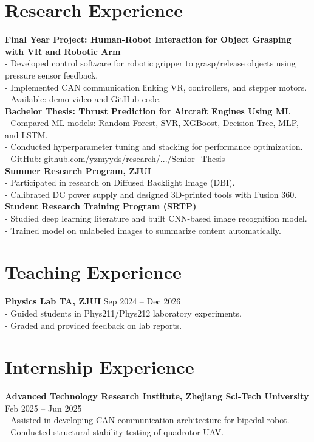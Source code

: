 \documentclass[a4paper,10pt]{article}
\begin{document}
\section*{Research Experience}
\textbf{Final Year Project: Human-Robot Interaction for Object Grasping with VR and Robotic Arm}\\
- Developed control software for robotic gripper to grasp/release objects using pressure sensor feedback.\\
- Implemented CAN communication linking VR, controllers, and stepper motors.\\
- Available: demo video and GitHub code.\\[1mm]
\textbf{Bachelor Thesis: Thrust Prediction for Aircraft Engines Using ML}\\
- Compared ML models: Random Forest, SVR, XGBoost, Decision Tree, MLP, and LSTM.\\
- Conducted hyperparameter tuning and stacking for performance optimization.\\
- GitHub: \href{https://github.com/yzmyyds/research/tree/c8a820a19e95e724b6bed19c4a7711d09be95336/Senior_Thesis}{github.com/yzmyyds/research/.../Senior\_Thesis}\\[1mm]
\textbf{Summer Research Program, ZJUI}\\
- Participated in research on Diffused Backlight Image (DBI).\\
- Calibrated DC power supply and designed 3D-printed tools with Fusion 360.\\[1mm]
\textbf{Student Research Training Program (SRTP)}\\
- Studied deep learning literature and built CNN-based image recognition model.\\
- Trained model on unlabeled images to summarize content automatically.

\section*{Teaching Experience}
\textbf{Physics Lab TA, ZJUI} \hfill Sep 2024 – Dec 2026\\
- Guided students in Phys211/Phys212 laboratory experiments.\\
- Graded and provided feedback on lab reports.

\section*{Internship Experience}
\textbf{Advanced Technology Research Institute, Zhejiang Sci-Tech University} \hfill Feb 2025 -- Jun 2025\\
- Assisted in developing CAN communication architecture for bipedal robot.\\
- Conducted structural stability testing of quadrotor UAV.
\end{document}
